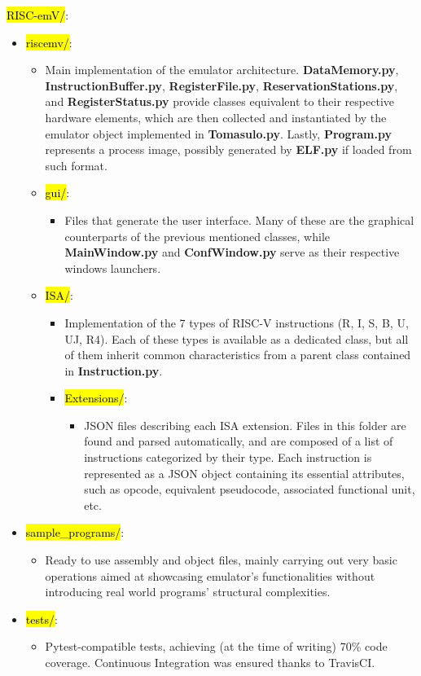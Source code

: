 \documentclass[12pt]{article}
\begin{document}
\noindent\hl{RISC-emV/}:
\begin{itemize}
    \item \hl{riscemv/}:
    \begin{itemize}
        \item Main implementation of the emulator architecture. \textbf{DataMemory.py}, \textbf{InstructionBuffer.py}, \textbf{RegisterFile.py}, \textbf{ReservationStations.py}, and \textbf{RegisterStatus.py} provide classes equivalent to their respective hardware elements, which are then collected and instantiated by the emulator object implemented in \textbf{Tomasulo.py}. Lastly, \textbf{Program.py} represents a process image, possibly generated by \textbf{ELF.py} if loaded from such format.
        \item \hl{gui/}:
        \begin{itemize}
            \item Files that generate the user interface. Many of these are the graphical counterparts of the previous mentioned classes, while \textbf{MainWindow.py} and \textbf{ConfWindow.py} serve as their respective windows launchers.
        \end{itemize}
        \item \hl{ISA/}:
        \begin{itemize}
            \item Implementation of the 7 types of RISC-V instructions (R, I, S, B, U, UJ, R4). Each of these types is available as a dedicated class, but all of them inherit common characteristics from a parent class contained in \textbf{Instruction.py}.
            \item \hl{Extensions/}:
            \begin{itemize}
                \item JSON files describing each ISA extension. Files in this folder are found and parsed automatically, and are composed of a list of instructions categorized by their type. Each instruction is represented as a JSON object containing its essential attributes, such as opcode, equivalent pseudocode, associated functional unit, etc.
            \end{itemize}
        \end{itemize}
    \end{itemize}
    \item \hl{sample\_programs/}:
    \begin{itemize}
        \item Ready to use assembly and object files, mainly carrying out very basic operations aimed at showcasing emulator’s functionalities without introducing real world programs’ structural complexities.
    \end{itemize}
    \item \hl{tests/}:
    \begin{itemize}
        \item Pytest-compatible tests, achieving (at the time of writing) 70\% code coverage. Continuous Integration was ensured thanks to TravisCI.
    \end{itemize}
\end{itemize}
\end{document}
